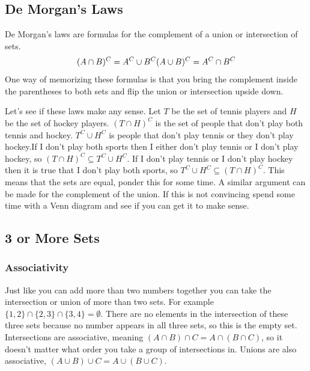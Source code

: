 \documentclass[
]{book}
\begin{document}
\hypertarget{de-morgans-laws}{%
\subsection{De Morgan's Laws}\label{de-morgans-laws}}

De Morgan's laws are formulas for the complement of a union or intersection of sets.
\[(A \cap B)^C = A^C \cup B^C \\
 (A \cup B)^C = A^C \cap B^C\]
One way of memorizing these formulas is that you bring the complement inside the parentheses to both sets and flip the union or intersection upside down.

Let's see if these laws make any sense. Let \(T\) be the set of tennis players and \(H\) be the set of hockey players. \((T \cap H)^C\) is the set of people that don't play both tennis and hockey. \(T^C \cup H^C\) is people that don't play tennis or they don't play hockey.If I don't play both sports then I either don't play tennis or I don't play hockey, so \((T \cap H)^C \subseteq T^C \cup H^C\). If I don't play tennis or I don't play hockey then it is true that I don't play both sports, so \(T^C \cup H^C \subseteq (T \cap H)^C\). This means that the sets are equal, ponder this for some time. A similar argument can be made for the complement of the union. If this is not convincing spend some time with a Venn diagram and see if you can get it to make sense.

\hypertarget{or-more-sets}{%
\subsection{3 or More Sets}\label{or-more-sets}}

\hypertarget{associativity}{%
\subsubsection{Associativity}\label{associativity}}

Just like you can add more than two numbers together you can take the intersection or union of more than two sets. For example \(\{1,2\} \cap \{2,3\} \cap \{3,4\} = \emptyset\). There are no elements in the intersection of these three sets because no number appears in all three sets, so this is the empty set. Intersections are associative, meaning \((A \cap B) \cap C= A \cap (B \cap C)\), so it doesn't matter what order you take a group of intersections in. Unions are also associative, \((A \cup B) \cup C= A \cup (B \cup C)\).
\end{document}
